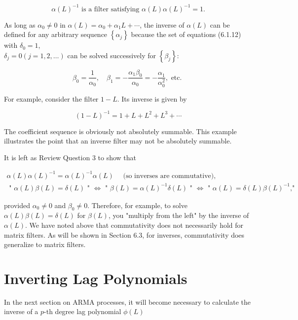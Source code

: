 \documentclass[10pt]{article}
\begin{document}
\begin{equation*}
\alpha(L)^{-1} \text { is a filter satisfying } \alpha(L) \alpha(L)^{-1}=1 . \tag{6.1.14}
\end{equation*}


As long as $\alpha_{0} \neq 0$ in $\alpha(L)=\alpha_{0}+\alpha_{1} L+\cdots$, the inverse of $\alpha(L)$ can be defined for any arbitrary sequence $\left\{\alpha_{j}\right\}$ because the set of equations (6.1.12) with $\delta_{0}=1$,\\
$\delta_{j}=0(j=1,2, \ldots)$ can be solved successively for $\left\{\beta_{j}\right\}:$

$$
\beta_{0}=\frac{1}{\alpha_{0}}, \quad \beta_{1}=-\frac{\alpha_{1} \beta_{0}}{\alpha_{0}}=-\frac{\alpha_{1}}{\alpha_{0}^{2}}, \text { etc. }
$$

For example, consider the filter $1-L$. Its inverse is given by

$$
(1-L)^{-1}=1+L+L^{2}+L^{3}+\cdots
$$

The coefficient sequence is obviously not absolutely summable. This example illustrates the point that an inverse filter may not be absolutely summable.

It is left as Review Question 3 to show that

\[
\begin{array}{r}
\alpha(L) \alpha(L)^{-1}=\alpha(L)^{-1} \alpha(L) \quad \text { (so inverses are commutative), } \\
\text { " } \alpha(L) \beta(L)=\delta(L) \text { " } \Leftrightarrow \text { " } \beta(L)=\alpha(L)^{-1} \delta(L) \text { " } \Leftrightarrow \text { " } \alpha(L)=\delta(L) \beta(L)^{-1} \text {," } \tag{6.1.15b}
\end{array}
\]

provided $\alpha_{0} \neq 0$ and $\beta_{0} \neq 0$. Therefore, for example, to solve $\alpha(L) \beta(L)=\delta(L)$ for $\beta(L)$, you "multiply from the left" by the inverse of $\alpha(L)$. We have noted above that commutativity does not necessarily hold for matrix filters. As will be shown in Section 6.3, for inverses, commutativity does generalize to matrix filters.

\section*{Inverting Lag Polynomials}
In the next section on ARMA processes, it will become necessary to calculate the inverse of a $p$-th degree lag polynomial $\phi(L)$
\end{document}

